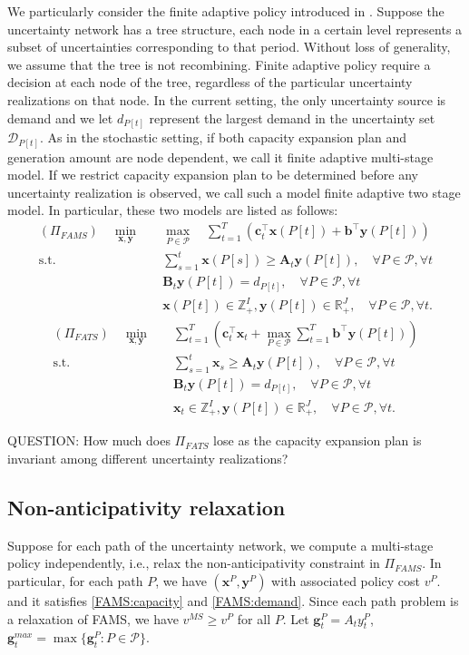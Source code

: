 \documentclass[10pt]{article}
\theoremstyle{plain}
\theoremstyle{definition}
\theoremstyle{remark}
\newcommand{\mb}{\mathbf}
\newcommand{\mcal}{\mathcal}
\newcommand{\tr}{^{\top}}
\newcommand{\subjectto}{\text{s.t.}}
\newcommand{\bA}{\mathbf{A}}
\newcommand{\bB}{\mathbf{B}}
\newcommand{\bb}{\mathbf{b}}
\newcommand{\bx}{\mathbf{x}}
\newcommand{\by}{\mathbf{y}}
\newcommand{\cP}{\mathcal{P}}
\newcommand{\Z}{\mathbb{Z}}
\newcommand{\R}{\mathbb{R}}
\begin{document}
We particularly consider the finite adaptive policy introduced in \citet{bertsimas2010fa}.
Suppose the uncertainty network has a tree structure, each node in a certain level
represents a subset of uncertainties corresponding to that period.
Without loss of generality, we assume that the tree is not recombining.
Finite adaptive policy require a decision at each node of the tree, regardless of the
particular uncertainty realizations on that node.
In the current setting, the only uncertainty source is demand and we let $d_{P[t]}$
represent the largest demand in the uncertainty set $\mcal{D}_{P[t]}$.
As in the stochastic setting, 
if both capacity expansion plan and generation amount are node dependent, we call it
finite adaptive multi-stage model. If we restrict capacity expansion plan to be determined
before any uncertainty realization is observed, we call such a model finite adaptive two
stage model. In particular, these two models are listed as follows:
\begin{subequations}\label{model:FAMS}
\begin{align}
(\Pi_{FAMS}) \quad \min_{\bx, \by} \quad
& \max_{P \in \cP} \quad  \sum_{t=1}^{T}(\mb{c}_t\tr \bx(P[t]) + \bb\tr\by(P[t]))\\
\subjectto\quad 
& \sum_{s=1}^t\bx(P[s]) \ge \bA_t\by(P[t]), \quad \forall P\in \cP, \forall t \label{FAMS:capacity}\\
& \bB_t\by(P[t]) = d_{P[t]}, \quad \forall P\in \cP, \forall t \label{FAMS:demand}\\
& \bx(P[t])\in \Z^I_+, \by(P[t])\in \R^J_+, \quad \forall P\in \cP, \forall t.
\end{align}
\end{subequations}
\begin{align*}
(\Pi_{FATS}) \quad \min_{\bx, \by} \quad 
&\sum_{t=1}^{T} (\mb{c}_t\tr \bx_t + \max_{P \in \cP}\sum_{t=1}^{T}\bb\tr\by(P[t]))\\
\subjectto\quad 
& \sum_{s=1}^t\bx_s \ge \bA_t\by(P[t]), \quad \forall P\in \cP, \forall t\\
& \bB_t\by(P[t]) = d_{P[t]}, \quad \forall P\in \cP, \forall t\\
& \bx_t\in \Z^I_+, \by(P[t])\in \R^J_+, \quad \forall P\in \cP, \forall t.
\end{align*}

{\large \color{red} QUESTION: \color{blue}
	How much does $\Pi_{FATS}$ lose as the capacity expansion
	plan is invariant among different uncertainty realizations?}

\subsection*{Non-anticipativity relaxation}
Suppose for each path of the uncertainty network, we compute a multi-stage policy
independently, i.e., relax the non-anticipativity constraint in $\Pi_{FAMS}$.
In particular, for each path $P$, we have $(\bx^{P}, \by^{P})$ with associated policy
cost $v^P$. and it satisfies \eqref{FAMS:capacity} and \eqref{FAMS:demand}.
Since each path problem is a relaxation of FAMS, we have $v^{MS} \ge v^P$ for all $P$.
Let $\mb{g}^P_t = A_ty^P_t$, $\mb{g}_t^{max} = \max\{\mb{g}^P_t: P\in \cP\}$.
\end{document}
